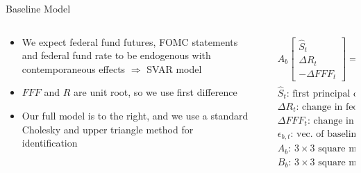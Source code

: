 \documentclass[9pt]{beamer}
\begin{document}
	
	\begin{frame}{Baseline Model}
		
		\begin{columns}
			\begin{column}{0.48\textwidth}
				\begin{itemize}
					\item We expect federal fund futures, FOMC statements and federal fund rate to be endogenous with contemporaneous effects \quad \quad \quad$\Rightarrow$ SVAR model
					\item $FFF$ and $R$ are unit root, so we use first difference
					\item Our full model is to the right, and we use a standard Cholesky and upper triangle method for identification
				\end{itemize}
			\end{column}
			\begin{column}{0.5\textwidth}
				\scriptsize\begin{align}
				&A_b\begin{bmatrix}
				\hat{S}_t\\
				\Delta R_t\\
				-\Delta FFF_t
				\end{bmatrix} =
				B_b\begin{bmatrix}
				\hat{S}_{t-1}\\
				\Delta{R}_{t-1}\\
				\Delta FFF_{t-1}
				\end{bmatrix} + \epsilon_{b,t} \nonumber \\
				&\hat{S}_t\text{: first principal component of semantic factors} \nonumber \\
				&\Delta R_t\text{: change in federal funds rate} \nonumber \\
				&\Delta FFF_t\text{: change in federal funds futures} \nonumber \\
				&\epsilon_{b,t}\text{: vec. of baseline, structural innovations} \nonumber \\
				&A_b\text{: $3\times 3$ square matrix of contemp. coeff.} \nonumber \\
				&B_b\text{: $3\times 3$ square matrix of lag coeff.} \nonumber
				\end{align}
			\end{column}
		\end{columns}
	\end{frame}
\end{document}

